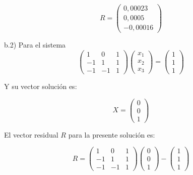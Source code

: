 \begin{equation*}
    R=
    \begin{pmatrix}
        0,00023 \\
        0,0005 \\
        -0,00016
    \end{pmatrix}
\end{equation*}

b.2) Para el sistema
\begin{equation*}
    \begin{pmatrix}
        1 & 0 & 1 \\
        -1 & 1 & 1 \\
        -1 & -1 & 1
    \end{pmatrix}
    \begin{pmatrix}
        x_1 \\
        x_2 \\
        x_3
    \end{pmatrix}    
    =    
    \begin{pmatrix}
        1 \\
        1 \\
        1
    \end{pmatrix}
\end{equation*}

Y su vector solución es:

\begin{equation*}
    X=
    \begin{pmatrix}
        0 \\
        0 \\
        1
    \end{pmatrix}    
\end{equation*}

El vector residual $R$ para la presente solución es:

\begin{equation*}
    R=
    \begin{pmatrix}
        1 & 0 & 1 \\
        -1 & 1 & 1 \\
        -1 & -1 & 1
    \end{pmatrix}
    \begin{pmatrix}
        0 \\
        0 \\
        1
    \end{pmatrix}    
    -   
    \begin{pmatrix}
        1 \\
        1 \\
        1
    \end{pmatrix}
\end{equation*}

